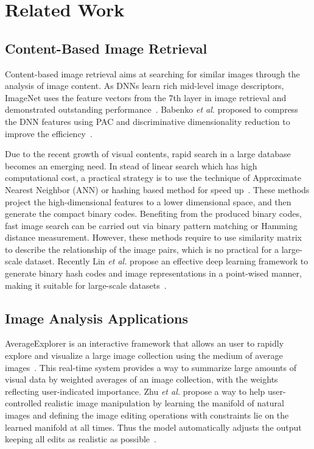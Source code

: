 \section{Related Work}
\subsection{Content-Based Image Retrieval}
Content-based image retrieval aims at searching for similar images
through the analysis of image content. As DNNs learn rich mid-level
image descriptors, ImageNet uses the feature vectors from the 7th
layer in image retrieval and demonstrated outstanding
performance~\cite{krizhevsky2012imagenet}. Babenko \textit{et al.}
proposed to compress the DNN features using PAC and discriminative
dimensionality reduction to improve the efficiency~\cite{babenko2014neural}.

Due to the recent growth of visual contents, rapid search in a large
database becomes an emerging need. In stead of linear search which has
high computational cost, a practical strategy is to use the technique
of Approximate Nearest Neighbor (ANN) or hashing based method for
speed up~\cite{gionis1999similarity,weiss2009spectral,kulis2009learning,
norouzi2011minimal,liu2012supervised,xia2014supervised}. These methods
project the high-dimensional features to a lower dimensional space, and
then generate the compact binary codes. Benefiting from the produced
binary codes, fast image search can be carried out via binary pattern
matching or Hamming distance measurement. However, these methods require
to use similarity matrix to describe the relationship of the image pairs, which
is no practical for a large-scale dataset. Recently Lin \textit{et al.}
propose an effective deep learning framework to generate binary hash codes
and image representations in a point-wised manner, making it suitable
for large-scale datasets~\cite{lin2015deep}.

\subsection{Image Analysis Applications}
AverageExplorer is an interactive framework that allows an user to rapidly
explore and visualize a large image collection using the medium of average
images~\cite{zhu2014averageexplorer}. This real-time system provides a
way to summarize large amounts of visual data by weighted averages of
an image collection, with the weights reflecting user-indicated importance.
Zhu \textit{et al.} propose a way to help user-controlled realistic image
manipulation by learning the manifold of natural images and defining the
image editing operations with constraints lie on the learned manifold at
all times. Thus the model automatically adjusts the output keeping all edits
as realistic as possible~\cite{zhu2016generative}.